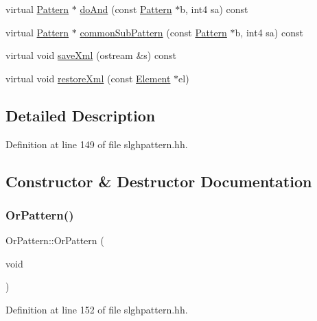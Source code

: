 \begin{DoxyCompactItemize}
\item 
virtual \mbox{\hyperlink{class_pattern}{Pattern}} $\ast$ \mbox{\hyperlink{class_or_pattern_a8375a0c2a661775d1211535540d68d3c}{do\+And}} (const \mbox{\hyperlink{class_pattern}{Pattern}} $\ast$b, int4 sa) const
\item 
virtual \mbox{\hyperlink{class_pattern}{Pattern}} $\ast$ \mbox{\hyperlink{class_or_pattern_a298d0540c485a3e056410848a4870c92}{common\+Sub\+Pattern}} (const \mbox{\hyperlink{class_pattern}{Pattern}} $\ast$b, int4 sa) const
\item 
virtual void \mbox{\hyperlink{class_or_pattern_ace1bee495fdc71ae71193551ad0910eb}{save\+Xml}} (ostream \&s) const
\item 
virtual void \mbox{\hyperlink{class_or_pattern_a75be51aafaaf737dc8ae34cc5907b66f}{restore\+Xml}} (const \mbox{\hyperlink{class_element}{Element}} $\ast$el)
\end{DoxyCompactItemize}


\subsection{Detailed Description}


Definition at line 149 of file slghpattern.\+hh.



\subsection{Constructor \& Destructor Documentation}
\mbox{\label{class_or_pattern_adfb8feafd5e28e0699e2279b02f79112}} 
\subsubsection{\texorpdfstring{OrPattern()}{OrPattern()}\hspace{0.1cm}{\footnotesize\ttfamily [1/3]}}
{\footnotesize\ttfamily Or\+Pattern\+::\+Or\+Pattern (\begin{DoxyParamCaption}\item[{void}]{ }\end{DoxyParamCaption})\hspace{0.3cm}{\ttfamily [inline]}}



Definition at line 152 of file slghpattern.\+hh.

